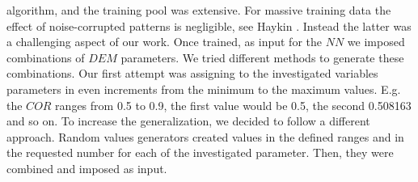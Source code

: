 algorithm, and the training pool was extensive.
For massive training data the effect of noise-corrupted patterns is negligible, see Haykin \cite{RefWorks:158}. 
Instead the latter was a challenging aspect of our work. Once trained, as input for the $NN$ we imposed 
combinations of $DEM$ parameters. 
We tried different methods to generate these combinations. 
Our first attempt was assigning to the investigated variables parameters in even increments 
from the minimum to the maximum values. 
E.g. the $COR$ ranges from 0.5 to 0.9, the first value would be 0.5, the second 0.508163 and so on. 
To increase the generalization, we decided to follow a different approach. 
Random values generators created values in the defined ranges and in the requested 
number for each of the investigated parameter. Then, they were combined and imposed as input.\\

